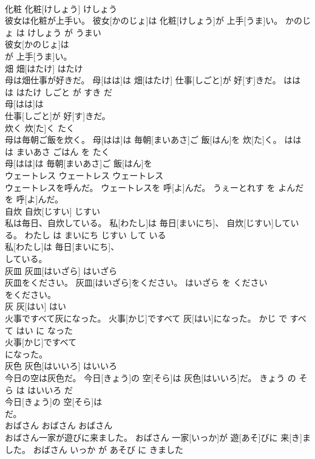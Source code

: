 \documentclass[8pt]{extreport}
\begin{document}
\begin{CJK}{UTF8}{min}
\\	化粧	化粧[けしょう]	けしょう	
\\	彼女は化粧が上手い。	彼女[かのじょ]は 化粧[けしょう]が 上手[うま]い。	かのじょ は けしょう が うまい	
\\	彼女[かのじょ]は
\\	が 上手[うま]い。			
\\	畑	畑[はたけ]	はたけ	
\\	母は畑仕事が好きだ。	母[はは]は 畑[はたけ] 仕事[しごと]が 好[す]きだ。	はは は はたけ しごと が すき だ	
\\	母[はは]は
\\	仕事[しごと]が 好[す]きだ。			
\\	炊く	炊[た]く	たく	
\\	母は毎朝ご飯を炊く。	母[はは]は 毎朝[まいあさ]ご 飯[はん]を 炊[た]く。	はは は まいあさ ごはん を たく	
\\	母[はは]は 毎朝[まいあさ]ご 飯[はん]を
\\	ウェートレス	ウェートレス	ウェートレス	
\\	ウェートレスを呼んだ。	ウェートレスを 呼[よ]んだ。	うぇーとれす を よんだ	
\\	を 呼[よ]んだ。			
\\	自炊	自炊[じすい]	じすい	
\\	私は毎日、自炊している。	私[わたし]は 毎日[まいにち]、 自炊[じすい]している。	わたし は まいにち じすい して いる	
\\	私[わたし]は 毎日[まいにち]、
\\	している。			
\\	灰皿	灰皿[はいざら]	はいざら	
\\	灰皿をください。	灰皿[はいざら]をください。	はいざら を ください	
\\	をください。			
\\	灰	灰[はい]	はい	
\\	火事ですべて灰になった。	火事[かじ]ですべて 灰[はい]になった。	かじ で すべて はい に なった	
\\	火事[かじ]ですべて
\\	になった。			
\\	灰色	灰色[はいいろ]	はいいろ	
\\	今日の空は灰色だ。	今日[きょう]の 空[そら]は 灰色[はいいろ]だ。	きょう の そら は はいいろ だ	
\\	今日[きょう]の 空[そら]は
\\	だ。			
\\	おばさん	おばさん	おばさん	
\\	おばさん一家が遊びに来ました。	おばさん 一家[いっか]が 遊[あそ]びに 来[き]ました。	おばさん いっか が あそび に きました	

\end{CJK}
\end{document}
